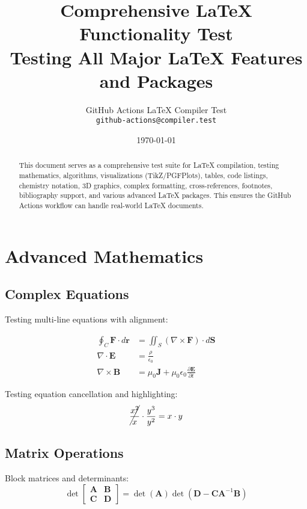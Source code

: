 \documentclass[11pt,a4paper]{article}
\title{\Huge \textbf{Comprehensive LaTeX Functionality Test}\\[0.5cm]
\Large Testing All Major LaTeX Features and Packages}
\author{GitHub Actions LaTeX Compiler Test\\[0.2cm]
\texttt{github-actions@compiler.test}}
\date{\today}
\theoremstyle{definition}
\begin{document}
\maketitle

\begin{abstract}
This document serves as a comprehensive test suite for LaTeX compilation, testing mathematics, algorithms, visualizations (TikZ/PGFPlots), tables, code listings, chemistry notation, 3D graphics, complex formatting, cross-references, footnotes, bibliography support, and various advanced LaTeX packages. This ensures the GitHub Actions workflow can handle real-world LaTeX documents.
\end{abstract}

\tableofcontents
\listoffigures
\listoftables
\newpage

\section{Advanced Mathematics}

\subsection{Complex Equations}

Testing multi-line equations with alignment:

\begin{align}
    \oint_C \mathbf{F} \cdot d\mathbf{r} &= \iint_S (\nabla \times \mathbf{F}) \cdot d\mathbf{S} \label{eq:stokes} \\
    \nabla \cdot \mathbf{E} &= \frac{\rho}{\epsilon_0} \label{eq:gauss} \\
    \nabla \times \mathbf{B} &= \mu_0\mathbf{J} + \mu_0\epsilon_0\frac{\partial \mathbf{E}}{\partial t} \label{eq:ampere}
\end{align}

Testing equation cancellation and highlighting:
\begin{equation}
    \cancel{\frac{x^2}{x}} \cdot \frac{y^3}{y^2} = x \cdot y
\end{equation}

\subsection{Matrix Operations}

Block matrices and determinants:
\begin{equation}
    \det\begin{bmatrix}
        \mathbf{A} & \mathbf{B} \\
        \mathbf{C} & \mathbf{D}
    \end{bmatrix} = \det(\mathbf{A})\det(\mathbf{D} - \mathbf{C}\mathbf{A}^{-1}\mathbf{B})
\end{equation}
\end{document}
